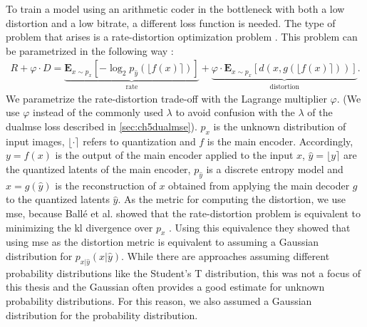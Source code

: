 To train a model using an arithmetic coder in the bottleneck with both a low distortion and a low bitrate, a different loss function is needed. The type of problem that arises is a rate-distortion optimization problem \citep{balle_variational_2018}. This problem can be parametrized in the following way \citep{minnen_joint_2018}:
\begin{align}
R + \varphi \cdot D = \underbrace{\mathbf{E}_{x\sim p_x} [ -\log_2 p_{\hat{y}}(\lfloor f(x)\rceil)]}_\text{rate}+ \underbrace{\varphi \cdot\mathbf{E}_{x\sim p_x} [d(x,g(\lfloor f(x)\rceil))]}_\text{distortion}.
\end{align}
We parametrize the rate-distortion trade-off with the Lagrange multiplier $\varphi$. (We use $\varphi$ instead of the commonly used $\lambda$ to avoid confusion with the $\lambda$ of the \ac{dualmse} loss described in \autoref{sec:ch5dualmse}). $p_x$ is the unknown distribution of input images, $\lfloor\cdot\rceil$ refers to quantization and $f$ is the main encoder. Accordingly, $y=f(x)$ is the output of the main encoder applied to the input $x$, $\hat{y} = \lfloor y\rceil$ are the quantized latents of the main encoder, $p_{\hat{y}}$ is a discrete entropy model and $\hat{x}=g(\hat{y})$ is the reconstruction of $x$ obtained from applying the main decoder $g$ to the quantized latents $\hat{y}$. As the metric for computing the distortion, we use \ac{mse}, because Ballé et al. showed that the rate-distortion problem is equivalent to minimizing the \ac{kl} divergence over $p_x$ \citep{balle_variational_2018}. Using this equivalence they showed that using \ac{mse} as the distortion metric is equivalent to assuming a Gaussian distribution for $p_{x|\hat{y}}(x|\hat{y})$. While there are approaches assuming different probability distributions like the Student's T distribution, this was not a focus of this thesis and the Gaussian often provides a good estimate for unknown probability distributions. For this reason, we also assumed a Gaussian distribution for the probability distribution.

